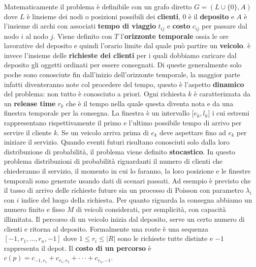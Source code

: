 \documentclass[
    article,            %
    12pt,                %
    oneside,            %
    a4paper,            %
    english,            %
    italian,                %
    sumario=tradicional,
]{abntex2}
\begin{document}
Matematicamente il problema è definibile con un grafo diretto {\(G = (L \cup \{ 0\},A)\)} dove {\(L\)} è l\textquotesingle insieme dei nodi o posizioni possibili dei \textbf{clienti}, {\(0\)} è il \textbf{deposito} e {\(A\)} è l'insieme di archi con associati \textbf{tempo di viaggio} {\(t_{ij}\)} e \textbf{costo} {\(c_{ij}\)} per passare dal nodo {\(i\)} al nodo {\(j\)}. \newline Viene definito con {\(T\)} l'\textbf{orizzonte temporale} ossia le ore lavorative del deposito e quindi l'orario limite dal quale può partire un \textbf{veicolo}.  è invece l'insieme delle \textbf{richieste dei clienti} per i quali dobbiamo caricare dal deposito gli oggetti ordinati per essere consegnati. Di queste generalmente solo poche sono conosciute fin dall'inizio dell'orizzonte temporale, la maggior parte infatti diventeranno note col procedere del tempo, questo è l'aspetto \textbf{dinamico} del problema: non tutto è conosciuto a priori.
\newline
Ogni richiesta {\(k\)} è caratterizzata da un \textbf{release time} {\(r_{k}\)} che è il tempo nella quale questa diventa nota e da una finestra temporale per la consegna. La finestra è un intervallo {\(\lbrack e_{k},l_{k}\rbrack\)} i cui estremi rappresentano rispettivamente il primo e l'ultimo possibile tempo di arrivo per servire il cliente $k$. Se un veicolo arriva prima di $e_k$ deve aspettare fino ad $e_k$ per iniziare il servizio.
\newline
Quando eventi futuri risultano conosciuti solo dalla loro distribuzione di probabilità, il problema viene definito \textbf{stocastico}. In questo problema distribuzioni di probabilità riguardanti il numero di clienti che chiederanno il servizio, il momento in cui lo faranno, la loro posizione e le finestre temporali sono generate usando dati di scenari passati. Ad esempio è previsto che il tasso di arrivo delle richieste future sia un processo di Poisson con parametro {\(\lambda_{i}\)} con {\(i\)} indice del luogo della richiesta.
\newline
Per quanto riguarda la consegna abbiamo un numero finito e fisso {\(M\)} di veicoli considerati, per semplicità, con capacità illimitata. Il percorso di un veicolo inizia dal deposito, serve un certo numero di clienti e ritorna al deposito. Formalmente una route è una sequenza $[-1,r_1,...,r_n,-1]$ dove $1 \leq r_i \leq |R|$ sono le richieste tutte distinte e $-1$ rappresenta il depot. Il \textbf{costo di un percorso} è $c(p) = c_{-1,r_1} + c_{r_1,r_2}+ \cdot \cdot \cdot + c_{r_n,-1}$.
\end{document}
